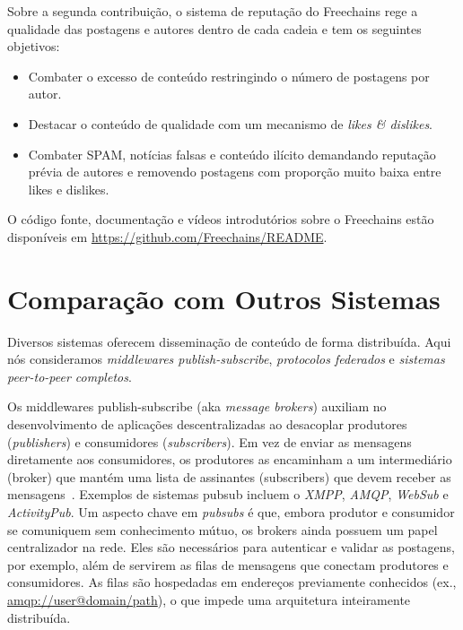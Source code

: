 \documentclass[12pt]{article}
\newcommand{\FC} {Freechains\xspace}
\begin{document}
%
Sobre a segunda contribuição, o sistema de reputação do \FC rege a qualidade
das postagens e autores dentro de cada cadeia e tem os seguintes objetivos:
%
\begin{itemize}
\item Combater o excesso de conteúdo restringindo o número de postagens por autor.
\item Destacar o conteúdo de qualidade com um mecanismo de \emph{likes \& dislikes}.
\item Combater SPAM, notícias falsas e conteúdo ilícito demandando reputação
      prévia de autores e removendo postagens com proporção muito baixa entre
      likes e dislikes.
\end{itemize}
%
O código fonte, documentação e vídeos introdutórios sobre o \FC estão
disponíveis em \url{https://github.com/Freechains/README}.


\section{Comparação com Outros Sistemas}
\label{sec.related}

Diversos sistemas oferecem disseminação de conteúdo de forma distribuída.
Aqui nós consideramos \emph{middlewares publish-subscribe},
\emph{protocolos federados} e \emph{sistemas peer-to-peer completos}.


Os middlewares publish-subscribe (aka \emph{message brokers}) auxiliam
no desenvolvimento de aplicações descentralizadas ao desacoplar produtores
(\emph{publishers}) e consumidores (\emph{subscribers}).
Em vez de enviar as mensagens diretamente aos consumidores, os produtores as
encaminham a um intermediário (broker) que mantém uma lista de assinantes
(subscribers) que devem receber as mensagens~\cite{TODO}.
Exemplos de sistemas pubsub incluem o \emph{XMPP}, \emph{AMQP}, \emph{WebSub} e
\emph{ActivityPub}.
Um aspecto chave em \emph{pubsubs} é que, embora produtor e consumidor se
comuniquem sem conhecimento mútuo, os brokers ainda possuem um papel
centralizador na rede.
Eles são necessários para autenticar e validar as postagens, por exemplo, além
de servirem as filas de mensagens que conectam produtores e consumidores.
As filas são hospedadas em endereços previamente conhecidos (ex.,
\url{amqp://user@domain/path}), o que impede uma arquitetura inteiramente
distribuída.
\end{document}
